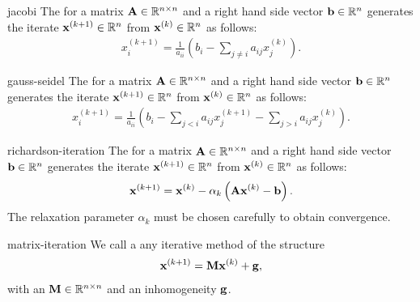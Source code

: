 
\begin{Definition}{jacobi}
  The  for a matrix $\mathbf A\in\mathbb R^{n\times n}$ and a
  right hand side vector $\mathbf b\in \mathbb R^n$ generates the iterate
  $\mathbf x^{(k+1)}\in \mathbb R^n$ from $\mathbf x^{(k)}\in \mathbb R^n$ as follows:
  \begin{gather}
     x^{(k+1)}_i = \frac1{a_{ii}}\left( b_i - \sum_{j\neq i} a_{ij}x^{(k)}_j\right).
  \end{gather}
\end{Definition}

\begin{Definition}{gauss-seidel}
  The  for a matrix $\mathbf A\in\mathbb R^{n\times n}$ and a
  right hand side vector $\mathbf b\in \mathbb R^n$ generates the iterate
  $\mathbf x^{(k+1)}\in \mathbb R^n$ from $\mathbf x^{(k)}\in \mathbb R^n$ as follows:
  \begin{gather}
    x^{(k+1)}_i = \frac1{a_{ii}}
    \left( b_i
      - \sum_{j< i} a_{ij}x^{(k+1)}_j
      - \sum_{j> i} a_{ij}x^{(k)}_j
  \right).
  \end{gather}
\end{Definition}

\begin{Definition}{richardson-iteration}
  The  for a matrix $\mathbf A\in\mathbb R^{n\times n}$ and a
  right hand side vector $\mathbf b\in \mathbb R^n$ generates the iterate
  $\mathbf x^{(k+1)}\in \mathbb R^n$ from $\mathbf x^{(k)}\in \mathbb R^n$ as follows:
  \begin{gather}
    \mathbf x^{(k+1)} = \mathbf x^{(k)} - 
    \alpha_k\left( \mathbf A\mathbf x^{(k)} - \mathbf b
  \right).
\end{gather}
The relaxation parameter $\alpha_k$ must be chosen carefully to obtain
convergence.
\end{Definition}

\begin{Definition}{matrix-iteration}
  We call a  any iterative method of the structure
  \begin{gather}
    \mathbf x^{(k+1)} = \mathbf M \mathbf x^{(k)} + \mathbf g,
  \end{gather}
  with an  $\mathbf M\in\mathbb R^{n\times n}$ and an inhomogeneity $\mathbf g$.
\end{Definition}

